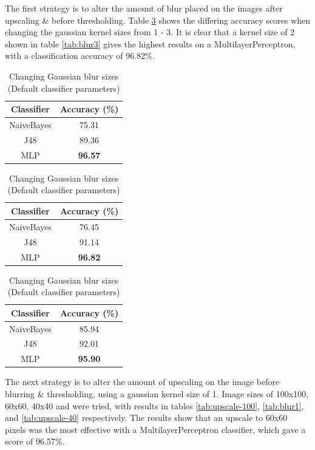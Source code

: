 \documentclass[12pt]{article}
\begin{document}
    \newpage
    The first strategy is to alter the amount of blur placed on the images after upscaling \& before thresholding. Table \ref{tab:blur} shows the differing accuracy scores when changing the gaussian kernel sizes from 1 - 3. It is clear that a kernel size of 2 shown in table \ref{tab:blur3} gives the highest results on a MultilayerPerceptron, with a classification accuracy of 96.82\%.

    \begin{table}[H]
      \begin{subtable}{.329\linewidth}
        \centering
        \caption{Kernel size of 1}
        \begin{tabular}{c|c}
          \toprule
          \multicolumn{1}{c|}{Classifier} & \multicolumn{1}{c}{Accuracy (\%)} \\
          \midrule
          NaiveBayes & 75.31 \\
          J48   & 89.36 \\
          MLP   & \textbf{96.57} \\
          \bottomrule
        \end{tabular}%
        \label{tab:blur1}%
      \end{subtable}
      \begin{subtable}{.329\linewidth}
        \centering
        \caption{Kernel size of 2}
        \begin{tabular}{c|c}
          \toprule
          Classifier & Accuracy (\%) \\
          \midrule
          NaiveBayes & 76.45 \\
          J48   & 91.14 \\
          MLP   & \textbf{96.82} \\
          \bottomrule
        \end{tabular}%
        \label{tab:blur2}%
      \end{subtable}
      \begin{subtable}{.329\linewidth}
        \centering
        \caption{Kernel size of 3}
        \begin{tabular}{c|c}
          \toprule
          Classifier & Accuracy (\%) \\
          \midrule
          NaiveBayes & 85.94 \\
          J48   & 92.01 \\
          MLP   & \textbf{95.90} \\
          \bottomrule
        \end{tabular}%
        \label{tab:blur3}%
      \end{subtable}
      \caption{Changing Gaussian blur sizes (Default classifier parameters)}
      \label{tab:blur}
    \end{table}
    The next strategy is to alter the amount of upscaling on the image before blurring \& thresholding, using a gaussian kernel size of 1. Image sizes of 100x100, 60x60, 40x40 and  were tried, with results in tables \ref{tab:upscale-100}, \ref{tab:blur1}, and \ref{tab:upscale-40} respectively. The results show that an upscale to 60x60 pixels was the most effective with a MultilayerPerceptron classifier, which gave a score of 96.57\%.
\end{document}
